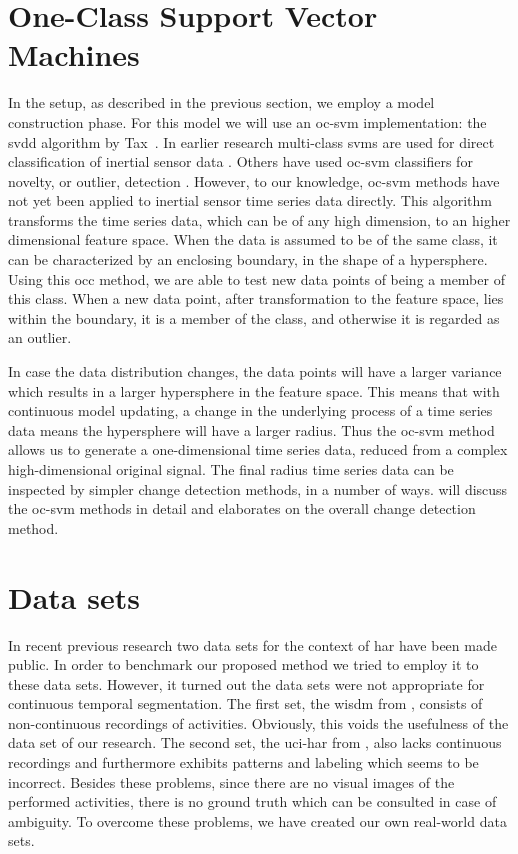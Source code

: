\section{One-Class Support Vector Machines}
In the setup, as described in the previous section, we employ a model construction phase.
For this model we will use an \acrlong{oc-svm} implementation: the \acrlong{svdd} algorithm by Tax~\cite{tax2001one}.
In earlier research multi-class \glspl{svm} are used for direct classification of inertial sensor data \cite{he2008activity,mountrakis2011support,anguita2012human}.
Others have used \gls{oc-svm} classifiers for novelty, or outlier, detection \cite{scholkopf1999support,camci2010change,li2003improving,ma2003time,tax1999support}.
However, to our knowledge, \gls{oc-svm} methods have not yet been applied to inertial sensor time series data directly.
This algorithm transforms the time series data, which can be of any high dimension, to an higher dimensional feature space.
When the data is assumed to be of the same class, it can be characterized by an enclosing boundary, in the shape of a hypersphere.
Using this \gls{occ} method, we are able to test new data points of being a member of this class.
When a new data point, after transformation to the feature space, lies within the boundary, it is a member of the class, and otherwise it is regarded as an outlier.

In case the data distribution changes, the data points will have a larger variance which results in a larger hypersphere in the feature space.
This means that with continuous model updating, a change in the underlying process of a time series data means the hypersphere will have a larger radius.
Thus the \gls{oc-svm} method allows us to generate a one-dimensional time series data, reduced from a complex high-dimensional original signal.
The final radius time series data can be inspected by simpler change detection methods, in a number of ways.
 will discuss the \gls{oc-svm} methods in detail and  elaborates on the overall change detection method.

\section{Data sets}
In recent previous research two data sets for the context of \gls{har} have been made public.
In order to benchmark our proposed method we tried to employ it to these data sets.
However, it turned out the data sets were not appropriate for continuous temporal segmentation.
The first set, the \gls{wisdm} from \cite{kwapisz2011activity}, consists of non-continuous recordings of activities.
Obviously, this voids the usefulness of the data set of our research.
The second set, the \gls{uci-har} from \cite{anguita2012human}, also lacks continuous recordings and furthermore exhibits patterns and labeling which seems to be incorrect.
Besides these problems, since there are no visual images of the performed activities, there is no ground truth which can be consulted in case of ambiguity.
To overcome these problems, we have created our own real-world data sets.

